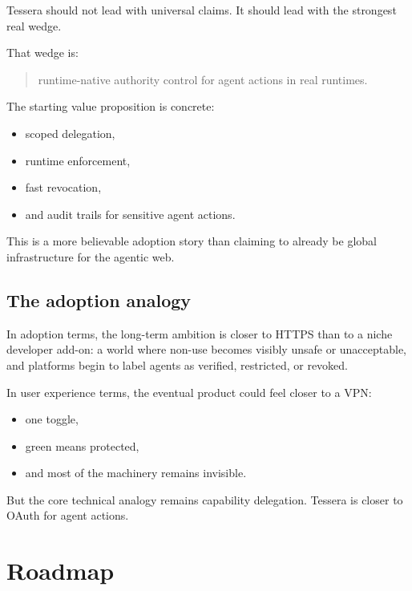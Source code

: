 \documentclass[11pt, a4paper]{article}
\begin{document}
Tessera should not lead with universal claims. It should lead with the strongest real wedge.

That wedge is:

\begin{quote}
runtime-native authority control for agent actions in real runtimes.
\end{quote}

The starting value proposition is concrete:

\begin{itemize}
  \item scoped delegation,
  \item runtime enforcement,
  \item fast revocation,
  \item and audit trails for sensitive agent actions.
\end{itemize}

This is a more believable adoption story than claiming to already be global infrastructure for the agentic web.

\subsection{The adoption analogy}

In adoption terms, the long-term ambition is closer to HTTPS than to a niche developer add-on: a world where non-use becomes visibly unsafe or unacceptable, and platforms begin to label agents as verified, restricted, or revoked.

In user experience terms, the eventual product could feel closer to a VPN:

\begin{itemize}
  \item one toggle,
  \item green means protected,
  \item and most of the machinery remains invisible.
\end{itemize}

But the core technical analogy remains capability delegation. Tessera is closer to OAuth for agent actions.

\section{Roadmap}
\end{document}

